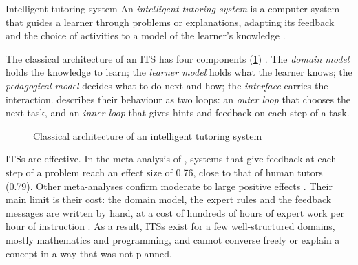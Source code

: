 \begin{definitionbox}{Intelligent tutoring system}
An \emph{intelligent tutoring system} is a computer system that guides a
learner through problems or explanations, adapting its feedback and the
choice of activities to a model of the learner's knowledge
\cite{woolf2009,nkambou2010}.
\end{definitionbox}

The classical architecture of an ITS has four components
(\cref{fig-its}) \cite{woolf2009,nkambou2010}. The \emph{domain model}
holds the knowledge to learn; the \emph{learner model} holds what the
learner knows; the \emph{pedagogical model} decides what to do next and
how; the \emph{interface} carries the interaction. \citet{vanlehn2006}
describes their behaviour as two loops: an \emph{outer loop} that chooses
the next task, and an \emph{inner loop} that gives hints and feedback on
each step of a task.

\begin{figure}[htbp]
\centering
{}
\caption{Classical architecture of an intelligent tutoring system}
\label{fig-its}
\end{figure}

ITSs are effective. In the meta-analysis of \citet{vanlehn2011}, systems
that give feedback at each step of a problem reach an effect size of 0.76,
close to that of human tutors (0.79). Other meta-analyses confirm moderate
to large positive effects \cite{ma2014,kulik2016}. Their main limit is
their cost: the domain model, the expert rules and the feedback messages
are written by hand, at a cost of hundreds of hours of expert work per hour
of instruction \cite{aleven2009}. As a result, ITSs exist for a few
well-structured domains, mostly mathematics and programming, and cannot
converse freely or explain a concept in a way that was not planned.

